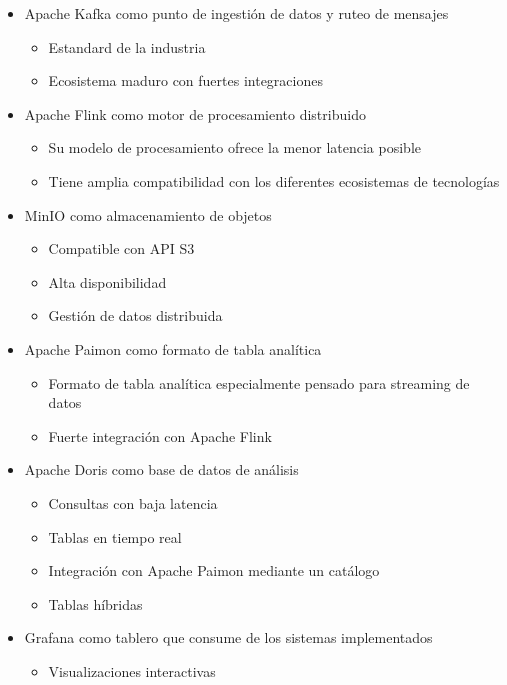 \begin{itemize}
    \item Apache Kafka como punto de ingestión de datos y ruteo de mensajes
       \begin{itemize}
           \item Estandard de la industria
           \item Ecosistema maduro con fuertes integraciones
       \end{itemize}
    \item Apache Flink como motor de procesamiento distribuido
       \begin{itemize}
           \item Su modelo de procesamiento ofrece la menor latencia posible
           \item Tiene amplia compatibilidad con los diferentes ecosistemas de tecnologías
       \end{itemize}
    \item MinIO como almacenamiento de objetos
       \begin{itemize}
           \item Compatible con API S3
           \item Alta disponibilidad
           \item Gestión de datos distribuida
       \end{itemize}
    \item Apache Paimon como formato de tabla analítica
       \begin{itemize}
           \item Formato de tabla analítica especialmente pensado para streaming de datos
           \item Fuerte integración con Apache Flink
       \end{itemize}
    \item Apache Doris como base de datos de análisis
       \begin{itemize}
           \item Consultas con baja latencia
           \item Tablas en tiempo real
           \item Integración con Apache Paimon mediante un catálogo
           \item Tablas híbridas
       \end{itemize}
    \item Grafana como tablero que consume de los sistemas implementados
       \begin{itemize}
           \item Visualizaciones interactivas

\end{itemize}
\end{itemize}
